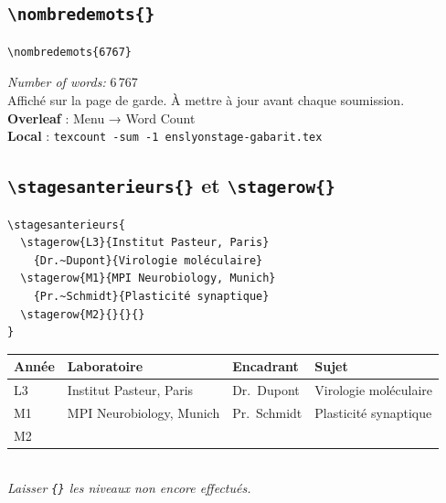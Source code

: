 \documentclass[12pt, a4paper]{article}
\begin{document}
\newpage

\subsection{\texttt{\textbackslash nombredemots\{\}}}

\begin{demo}
\begin{lstlisting}[style=latexcode]
\nombredemots{6767}
\end{lstlisting}
\tcblower
\small\textit{Number of words:} 6\,767\\[6pt]
{\footnotesize Affiché sur la page de garde. À mettre à jour avant chaque soumission.\\
\textbf{Overleaf} : Menu → Word Count\\
\textbf{Local} : \texttt{texcount -sum -1 enslyonstage-gabarit.tex}}
\end{demo}

\subsection[\texttt{\textbackslash stagesanterieurs} et \texttt{\textbackslash stagerow}]{\texttt{\textbackslash stagesanterieurs\{\}} et \texttt{\textbackslash stagerow\{\}}}

\begin{demo}[sidebyside=false]
\begin{lstlisting}[style=latexcode]
\stagesanterieurs{
  \stagerow{L3}{Institut Pasteur, Paris}
    {Dr.~Dupont}{Virologie moléculaire}
  \stagerow{M1}{MPI Neurobiology, Munich}
    {Pr.~Schmidt}{Plasticité synaptique}
  \stagerow{M2}{}{}{}
}
\end{lstlisting}
\tcblower
\footnotesize\centering
\begin{tabular}{@{}llll@{}}
  \toprule
  \textbf{Année} & \textbf{Laboratoire} & \textbf{Encadrant} & \textbf{Sujet}\\
  \midrule
  L3 & Institut Pasteur, Paris & Dr.~Dupont & Virologie moléculaire\\
  M1 & MPI Neurobiology, Munich & Pr.~Schmidt & Plasticité synaptique\\
  M2 & & & \\
  \bottomrule
\end{tabular}\\[4pt]
\itshape Laisser \texttt{\{\}} les niveaux non encore effectués.
\end{demo}

\newpage
\end{document}
